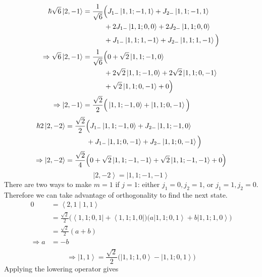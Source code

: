 \documentclass[a4paper, 11pt]{article}
\newcommand{\bra}[1]{\ensuremath{\left\langle#1\right|}}
\newcommand{\ket}[1]{\ensuremath{\left|#1\right\rangle}}
\newcommand{\bracket}[2]{\ensuremath{\left\langle #1 \middle| #2 \right\rangle}}
\newenvironment{solution}{%
	\begin{list}{}{%
			\setlength{\topsep}{0pt}%
			\setlength{\leftmargin}{0.5cm}%
			\setlength{\rightmargin}{0.5cm}%
			\setlength{\listparindent}{\parindent}%
			\setlength{\itemindent}{\parindent}%
			\setlength{\parsep}{\parskip}%
		}%
		\item[]}{\end{list}}
\begin{document}
\begin{enumerate}[leftmargin=0em]
\begin{solution}
\begin{align}
        \hbar\sqrt{6}\ket{2,-1} &= \frac{1}{\sqrt{6}}\Big(J_{1-}\ket{1,1;-1,1} + J_{2-}\ket{1,1;-1,1}\\
                                &\qquad\quad + 2J_{1-}\ket{1,1;0,0}+2J_{2-}\ket{1,1;0,0} \notag\\
                                &\qquad\quad + J_{1-}\ket{1,1;1,-1}+J_{2-}\ket{1,1;1,-1}\Big) \notag\\
        \Rightarrow \sqrt{6}\ket{2,-1} &= \frac{1}{\sqrt{6}}\Big(0 + \sqrt{2}\ket{1,1;-1,0} \\
                                &\qquad\quad + 2\sqrt{2}\ket{1,1;-1,0} + 2\sqrt{2}\ket{1,1;0,-1}\notag\\
                                &\qquad\quad + \sqrt{2}\ket{1,1;0,-1} + 0 \Big) \notag\\
        \Rightarrow \ket{2,-1} &= \frac{\sqrt{2}}{2}\Big(\ket{1,1;-1,0}+\ket{1,1;0,-1}\Big)
      \end{align}
      \begin{align}
        \hbar2\ket{2,-2} &= \frac{\sqrt{2}}{2}\Big(J_{1-}\ket{1,1;-1,0}+J_{2-}\ket{1,1;-1,0}\\
                     &\qquad\quad + J_{1-}\ket{1,1;0,-1}+J_{2-}\ket{1,1;0,-1}\Big) \notag \\
        \Rightarrow \ket{2,-2} &= \frac{\sqrt{2}}{4}\Big(0+\sqrt{2}\ket{1,1;-1,-1}+\sqrt{2}\ket{1,1;-1,-1}+0   \Big)
      \end{align}
      \begin{equation}
        \boxed{\ket{2,-2}= \ket{1,1;-1,-1}}
      \end{equation}
      There are two ways to make $m=1$ if $j=1$: either $j_1=0, j_2=1$, or $j_1=1, j_2=0$.
      Therefore we can take advantage of orthogonality to find the
      next state.
      \begin{align}
        0 &= \bracket{2,1}{1,1} \\
          &= \frac{\sqrt{2}}{2}\Big(\bra{1,1;0,1}+\bra{1,1;1,0}\Big)\Big(a\ket{1,1;0,1}+b\ket{1,1;1,0}\Big)\\
          &= \frac{\sqrt{2}}{2}(a+b)\\
        \Rightarrow a&=-b \\
      \end{align}
      \begin{equation}
        \Rightarrow \boxed{\ket{1,1}= \frac{\sqrt{2}}{2}\Big(\ket{1,1;1,0}-\ket{1,1;0,1}\Big)}
      \end{equation}
      Applying the lowering operator gives
      \begin{align}

\end{align}
\end{solution}
\end{enumerate}
\end{document}
